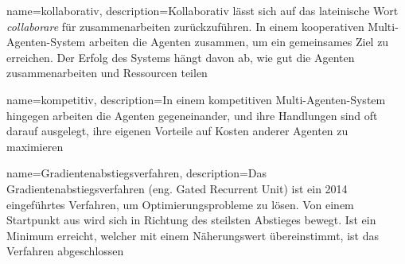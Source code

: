 {
	name=kollaborativ,
	description={Kollaborativ lässt sich auf das lateinische Wort \textit{collaborare} für zusammenarbeiten zurückzuführen. In einem kooperativen Multi-Agenten-System arbeiten die Agenten zusammen, um ein gemeinsames Ziel zu erreichen. Der Erfolg des Systems hängt davon ab, wie gut die Agenten zusammenarbeiten und Ressourcen teilen}
}

{
	name=kompetitiv,
	description={In einem kompetitiven Multi-Agenten-System hingegen arbeiten die Agenten gegeneinander, und ihre Handlungen sind oft darauf ausgelegt, ihre eigenen Vorteile auf Kosten anderer Agenten zu maximieren}
}

{
	name=Gradientenabstiegsverfahren,
	description={Das Gradientenabstiegsverfahren (eng. Gated Recurrent Unit) ist ein 2014 eingeführtes Verfahren, um Optimierungsprobleme zu lösen. Von einem Startpunkt aus wird sich in Richtung des steilsten Abstieges bewegt. Ist ein Minimum erreicht, welcher mit einem Näherungswert übereinstimmt, ist das Verfahren abgeschlossen}
}


